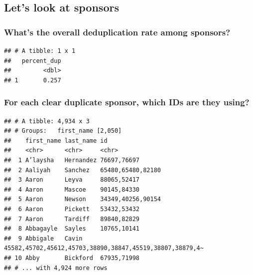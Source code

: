 \documentclass[
]{article}
\begin{document}
\hypertarget{lets-look-at-sponsors}{%
\subsection{Let's look at sponsors}\label{lets-look-at-sponsors}}

\hypertarget{whats-the-overall-deduplication-rate-among-sponsors}{%
\subsubsection{What's the overall deduplication rate among
sponsors?}\label{whats-the-overall-deduplication-rate-among-sponsors}}

\begin{verbatim}
## # A tibble: 1 x 1
##   percent_dup
##         <dbl>
## 1       0.257
\end{verbatim}

\hypertarget{for-each-clear-duplicate-sponsor-which-ids-are-they-using}{%
\subsubsection{\texorpdfstring{For each \textbf{clear} duplicate
sponsor, which IDs are they
using?}{For each clear duplicate sponsor, which IDs are they using?}}\label{for-each-clear-duplicate-sponsor-which-ids-are-they-using}}

\begin{verbatim}
## # A tibble: 4,934 x 3
## # Groups:   first_name [2,050]
##    first_name last_name id                                                      
##    <chr>      <chr>     <chr>                                                   
##  1 A’laysha   Hernandez 76697,76697                                             
##  2 Aaliyah    Sanchez   65480,65480,82180                                       
##  3 Aaron      Leyva     88065,52417                                             
##  4 Aaron      Mascoe    90145,84330                                             
##  5 Aaron      Newson    34349,40256,90154                                       
##  6 Aaron      Pickett   53432,53432                                             
##  7 Aaron      Tardiff   89840,82829                                             
##  8 Abbagayle  Sayles    10765,10141                                             
##  9 Abbigale   Cavin     45582,45702,45612,45703,38890,38847,45519,38807,38879,4~
## 10 Abby       Bickford  67935,71998                                             
## # ... with 4,924 more rows
\end{verbatim}
\end{document}
